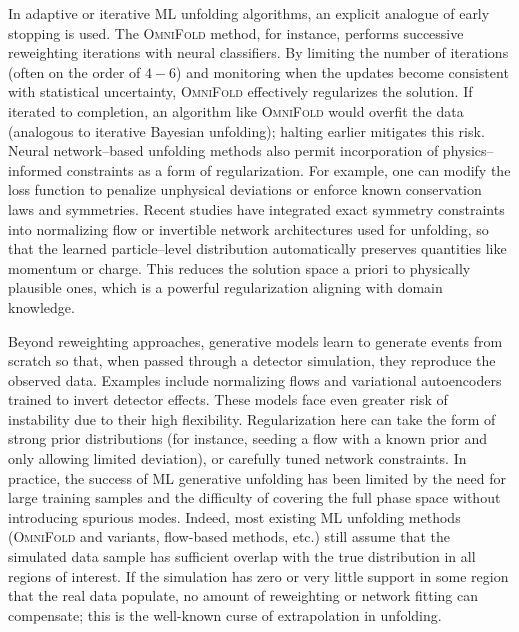         In adaptive or iterative ML unfolding algorithms, an explicit analogue of early stopping is used.
        The \textsc{OmniFold} method, for instance, performs successive reweighting iterations with neural classifiers.\kd{}  By limiting the number of iterations (often on the order of \(4-6\)) and monitoring when the updates become consistent with statistical uncertainty, \textsc{OmniFold} effectively regularizes the solution.\kd{}
        If iterated to completion, an algorithm like \textsc{OmniFold} would overfit the data (analogous to iterative Bayesian unfolding); halting earlier mitigates this risk.\kd{}
        Neural network--based unfolding methods also permit incorporation of physics--informed constraints as a form of regularization.
        For example, one can modify the loss function to penalize unphysical deviations or enforce known conservation laws and symmetries.
        Recent studies have integrated exact symmetry constraints into normalizing flow or invertible network architectures used for unfolding, so that the learned particle--level distribution automatically preserves quantities like momentum or charge.
        This reduces the solution space a priori to physically plausible ones, which is a powerful regularization aligning with domain knowledge.

        Beyond reweighting approaches, generative models learn to generate events from scratch so that, when passed through a detector simulation, they reproduce the observed data.\kd{}
        Examples include normalizing flows and variational autoencoders trained to invert detector effects.
        These models face even greater risk of instability due to their high flexibility.
        Regularization here can take the form of strong prior distributions (for instance, seeding a flow with a known prior and only allowing limited deviation), or carefully tuned network constraints.
        In practice, the success of ML generative unfolding has been limited by the need for large training samples and the difficulty of covering the full phase space without introducing spurious modes.
        Indeed, most existing ML unfolding methods (\textsc{OmniFold} and variants, flow-based methods, etc.) still assume that the simulated data sample has sufficient overlap with the true distribution in all regions of interest.\kd{}
        If the simulation has zero or very little support in some region that the real data populate, no amount of reweighting or network fitting can compensate; this is the well-known curse of extrapolation in unfolding.

